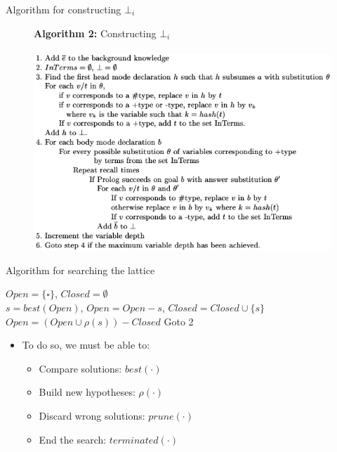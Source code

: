 \begin{frame}{Algorithm for constructing $\bot_i$}

\begin{figure}
    \centering
    \textbf{Algorithm 2:} Constructing $\bot_i$ \\ \hspace{1cm} \\
    \includegraphics[scale=.5]{images/algoboti.png}\\
    \label{fig:my_label}
\end{figure}
    
\end{frame}

\begin{frame}{Algorithm for searching the lattice}

\vfill

\setcounter{algocf}{2}
\begin{algorithm}[H]
\label{algoh}
\scriptsize
\caption{Lattice search algorithm}
$Open = \{\square\}$, $Closed = \emptyset$ \\
$s = best(Open)$, $Open = Open - s$, $Closed = Closed \cup \{s\}$  
$Open = (Open \cup \rho(s)) - Closed$ 
Goto 2
\end{algorithm}

\vfill

\begin{itemize}
    \item<2-> To do so, we must be able to:
    \begin{itemize}
        \item<2-> Compare solutions: $best(\cdot)$
        \item<2-> Build new hypotheses: $\rho(\cdot)$
        \item<2-> Discard wrong solutions: $prune(\cdot)$
        \item<2-> End the search: $terminated(\cdot)$
    \end{itemize}
\end{itemize}

\vfill

\end{frame}


